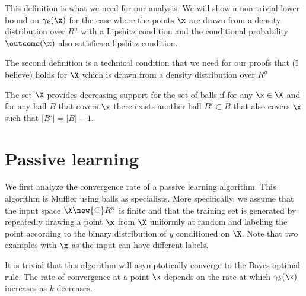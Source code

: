 This definition is what we need for our analysis. We will show a
non-trivial lower bound on $\gamma_k(\x)$ for the case where the
points $\x$ are drawn from a density distribution over $R^n$ with a
Lipshitz condition and the conditional probability $\outcome(\x)$ also
satisfies a lipshitz condition.


The second definition is a technical condition that we need for our
proofs that (I believe) holds for $\X$ which is drawn from a density
distribution over $R^n$
\begin{definition}
The set $\X$ provides decreasing support for the set of balls if for
any $\x \in \X$ and for any ball $B$ that covers $\x$ there exists
another ball $B' \subset B$ that also covers $\x$ such that $|B'| = |B|-1$.
\end{definition}


\section{Passive learning}

We first analyze the convergence rate of a passive learning algorithm.
This algorithm is Muffler using balls as specialists. More
specifically, we assume that the input space $\X \new{\subseteq}  R^n$ is finite
and that the training set is generated by repeatedly drawing a point
$\x$ from $\X$ uniformly at random and labeling the point according
to the binary distribution of $y$ conditioned on $\X$. Note that two
examples with $\x$ as the input can have different labels.

It is trivial that this algorithm will asymptotically converge to the
Bayes optimal rule. The rate of convergence at a point $\x$ depends on 
the rate at which $\gamma_k(\x)$ increases as $k$ decreases.
%
%
%  

